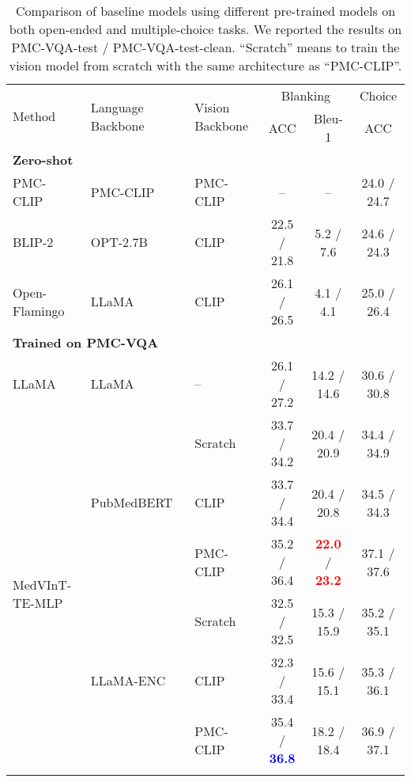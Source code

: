 \documentclass{article}
\begin{document}
\begin{table}[htb]
\centering
\footnotesize
\setlength{\tabcolsep}{3pt}
\caption{Comparison of baseline models using different pre-trained models on both open-ended and multiple-choice tasks. We reported the results on PMC-VQA-test / PMC-VQA-test-clean. ``Scratch'' means to train the vision model from scratch with the same architecture as ``PMC-CLIP''.} 
\vspace{3pt}
\begin{tabular}{l|l|l|cc|c}
\toprule
\multirow{2}{*}{Method} & \multirow{2}{*}{Language Backbone} & \multirow{2}{*}{Vision Backbone} & \multicolumn{2}{c|}{Blanking} & Choice    \\ & & & ACC  & Bleu-1   & ACC  \\ \midrule
  \multicolumn{6}{l}{\textbf{ Zero-shot}} \\ \midrule
 PMC-CLIP~\cite{lin2023pmcclip} &  PMC-CLIP~\cite{lin2023pmcclip} &  PMC-CLIP~\cite{lin2023pmcclip} & -- & -- & 24.0 / 24.7 \\ 
 BLIP-2~\cite{li2023blip} &  OPT-2.7B~\cite{Zhang2022OPTOP} & CLIP~\cite{radford2021learning}  & 22.5 / 21.8 & 5.2 / 7.6 & 24.6 / 24.3 \\
 Open-Flamingo~\cite{awadalla2023openflamingo} & LLaMA\cite{touvron2023llama} & CLIP~\cite{radford2021learning} & 26.1 / 26.5 & 4.1 / 4.1 & 25.0 / 26.4 \\ \midrule
  \multicolumn{6}{l}{\textbf{Trained on PMC-VQA}}\\ \midrule
LLaMA~\cite{touvron2023llama} & LLaMA~\cite{touvron2023llama} & -- & 26.1 / 27.2 & 14.2 / 14.6 & 30.6 / 30.8  \\ \midrule
\multirow{9}{*}{MedVInT-TE-MLP} & \multirow{3}{*}{PubMedBERT~\cite{gu2021domain}} & Scratch  & 33.7 / 34.2 & {20.4} / 20.9 & 34.4 / 34.9\\
 & & CLIP~\cite{radford2021learning}    & 33.7 / 34.4 & {20.4} / 20.8 & 34.5 / 34.3\\
 & & PMC-CLIP~\cite{lin2023pmcclip}  & {35.2} / {36.4} & \textcolor{red}{\bf 22.0} / \textcolor{red}{\bf 23.2} & 37.1 / 37.6\\ \cmidrule{2-6} 
 & \multirow{3}{*}{LLaMA-ENC~\cite{touvron2023llama}} & Scratch  & 32.5  /  32.5 & 15.3 / 15.9 & 35.2 / 35.1\\
 & & CLIP~\cite{radford2021learning}     & 32.3 / 33.4 & 15.6 / 15.1 & 35.3 / 36.1\\
 & & PMC-CLIP~\cite{lin2023pmcclip}  & {35.4} / \textcolor{blue}{\bf 36.8} & 18.2 / 18.4 & 36.9 / 37.1 \\ \cmidrule{2-6} 

\end{tabular}
\end{table}
\end{document}

